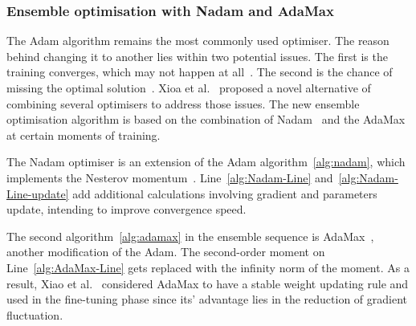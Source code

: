 \subsubsection{Ensemble optimisation with Nadam and AdaMax}
The Adam algorithm remains the most commonly used optimiser.
The reason behind changing it to another lies within two potential issues.
The first is the training converges, which may not happen at all~\cite{reddi_convergence_2019}.
The second is the chance of missing the optimal solution~\cite{wilson_marginal_2017}.
Xioa et al.~\cite{xiao_accurate_2019} proposed a novel alternative of combining several optimisers to address those issues.
The new ensemble optimisation algorithm is based on the combination of Nadam~\cite{dozat_nadam_2016} and the AdaMax~\cite{kingma_adam_2017} at certain moments of training.

%
%
The Nadam optimiser is an extension of the Adam algorithm~\ref{alg:nadam}, which implements the Nesterov momentum~\cite{dozat_nadam_2016}.
Line~\ref{alg:Nadam-Line} and~\ref{alg:Nadam-Line-update} add additional calculations involving gradient and parameters update, intending to improve convergence speed.

%
%
The second algorithm~\ref{alg:adamax} in the ensemble sequence is AdaMax~\cite{kingma_adam_2017}, another modification of the Adam.
The second-order moment on Line~\ref{alg:AdaMax-Line} gets replaced with the infinity norm of the moment.
As a result, Xiao et al.~\cite{xiao_accurate_2019} considered AdaMax to have a stable weight updating rule and used in the fine-tuning phase since its' advantage lies in the reduction of gradient fluctuation. 

